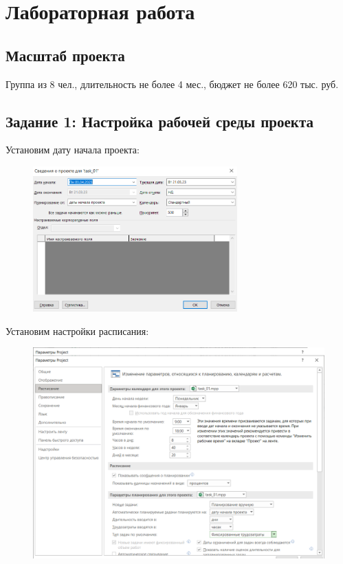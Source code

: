 \chapter{Лабораторная работа}

\section*{Масштаб проекта}

Группа из 8 чел., длительность не более 4 мес., бюджет не более 620 тыс. руб.

\section*{Задание 1: Настройка рабочей среды проекта}

Установим дату начала проекта:

\begin{figure}[H]
	\begin{center}
		\includegraphics[width=0.7\textwidth]{imgs/task_1_0.png}
	\end{center}
\end{figure}

Установим настройки расписания:

\begin{figure}[H]
	\begin{center}
		\includegraphics[width=\textwidth]{imgs/task_1_1.png}
	\end{center}
\end{figure}

